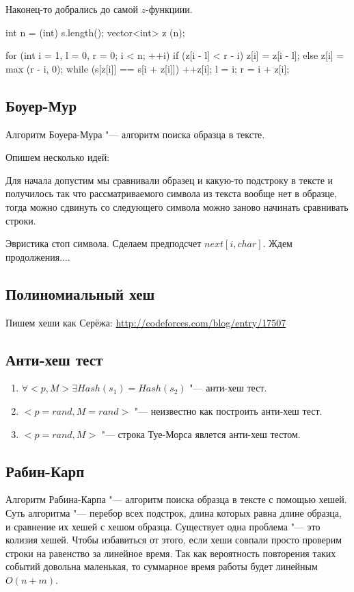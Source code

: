 Наконец-то добрались до самой $z$-функциии.

\begin{cppcode}
int n = (int) s.length();
vector<int> z (n);

for (int i = 1, l = 0, r = 0; i < n; ++i) {
  if (z[i - l] < r - i) {
    z[i] = z[i - l];
  } else {
    z[i] = max (r - i, 0);
    while (s[z[i]] == s[i + z[i]])
      ++z[i];
    l = i; 
    r = i + z[i];
  }
}
\end{cppcode} 


\subsection{Боуер-Мур}
Алгоритм Боуера-Мура "--- алгоритм поиска образца в тексте. 

Опишем несколько идей:

Для начала допустим мы сравнивали образец и какую-то подстроку в тексте и получилось так что рассматриваемого символа из текста вообще нет в образце, тогда можно сдвинуть со следующего символа можно заново начинать сравнивать строки. 

Эвристика стоп символа.
Сделаем предподсчет $next[i, char]$.
Ждем продолжения....

\subsection{Полиномиальный хеш}
Пишем хеши как Серёжа:
\url{http://codeforces.com/blog/entry/17507}

\subsection{Анти-хеш тест}

\begin{enumerate}
\item $\forall <p, M> \exists Hash(s_1) = Hash(s_2)$ "--- анти-хеш тест.
\item $<p = rand, M = rand>$ "--- неизвестно как построить анти-хеш тест.
\item $<p = rand, M>$ "--- строка Туе-Морса явлется анти-хеш тестом.
\end{enumerate}

\subsection{Рабин-Карп}

Алгоритм Рабина-Карпа "--- алгоритм поиска образца в тексте с помощью хешей.
Суть алгоритма "--- перебор всех подстрок, длина которых равна длине образца, и сравнение их хешей с хешом образца. 
Существует одна проблема "--- это колизия хешей.
Чтобы избавиться от этого, если хеши совпали просто проверим строки на равенство за линейное время. 
Так как вероятность повторения таких событий довольна маленькая, то суммарное время работы будет линейным $O (n + m)$.

